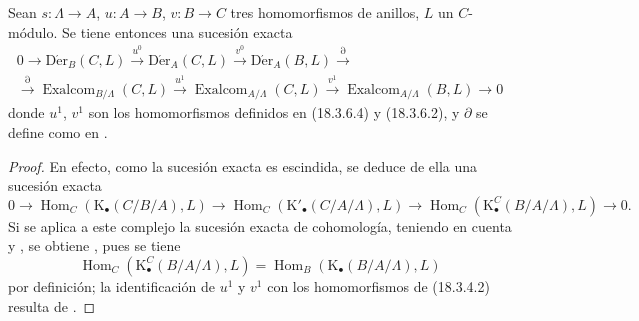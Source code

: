\begin{proposition}[20.6.25]
\label{0.20.6.25-fr}
Sean $s:\Lambda\to A$, $u:A\to B$, $v:B\to C$ tres homomorfismos
de anillos, $L$ un $C$-módulo. Se tiene entonces una sucesión exacta
\begin{equation}
\tag{20.6.25.1}
\label{0.20.6.25.1-fr}
\begin{split}
  0\to\operatorname{D\acute{e}r}_B(C,L)\xrightarrow{u^0}
  \operatorname{D\acute{e}r}_A(C,L)\xrightarrow{v^0}
  \operatorname{D\acute{e}r}_A(B,L)\xrightarrow{\partial} \\
  \xrightarrow{\partial}\operatorname{Exalcom}_{B/\Lambda}(C,L)\xrightarrow{u^1}
  \operatorname{Exalcom}_{A/\Lambda}(C,L)\xrightarrow{v^1}
  \operatorname{Exalcom}_{A/\Lambda}(B,L)\to0
\end{split}
\end{equation}
donde $u^1$, $v^1$ son los homomorfismos definidos en \textup{(18.3.6.4)} y
\textup{(18.3.6.2)}, y $\partial$ se define como en .
\end{proposition}

\begin{proof}
En efecto, como la sucesión exacta  es escindida, se
deduce de ella una sucesión exacta
\[
  0\to\operatorname{Hom}_C(\mathrm{K}_\bullet(C/B/A),L)\to
  \operatorname{Hom}_C(\mathrm{K}'_\bullet(C/A/\Lambda),L)\to
  \operatorname{Hom}_C(\mathrm{K}^C_\bullet(B/A/\Lambda),L)\to0.
\]
Si se aplica a este complejo la sucesión exacta de cohomología, teniendo en cuenta
 y , se obtiene
, pues se tiene
\[
  \operatorname{Hom}_C(\mathrm{K}^C_\bullet(B/A/\Lambda),L)
  =\operatorname{Hom}_B(\mathrm{K}_\bullet(B/A/\Lambda),L)
\]
por definición; la identificación de $u^1$ y $v^1$ con los homomorfismos
de (18.3.4.2) resulta de .
\end{proof}

